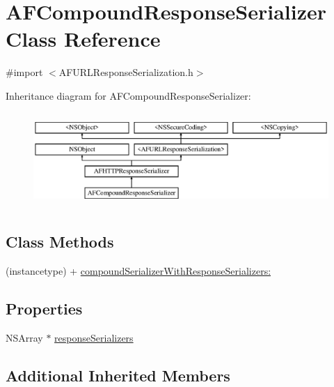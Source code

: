 \hypertarget{interface_a_f_compound_response_serializer}{}\section{A\+F\+Compound\+Response\+Serializer Class Reference}
\label{interface_a_f_compound_response_serializer}


{\ttfamily \#import $<$A\+F\+U\+R\+L\+Response\+Serialization.\+h$>$}

Inheritance diagram for A\+F\+Compound\+Response\+Serializer\+:\begin{figure}[H]
\begin{center}
\leavevmode
\includegraphics[height=3.624595cm]{interface_a_f_compound_response_serializer}
\end{center}
\end{figure}
\subsection*{Class Methods}
\begin{DoxyCompactItemize}
\item 
(instancetype) + \hyperlink{interface_a_f_compound_response_serializer_a48bf2d3d5a18d9cc73b6e29ef30c6e56}{compound\+Serializer\+With\+Response\+Serializers\+:}
\end{DoxyCompactItemize}
\subsection*{Properties}
\begin{DoxyCompactItemize}
\item 
N\+S\+Array $\ast$ \hyperlink{interface_a_f_compound_response_serializer_a909fdc29d0b342748bac1f925390c0bc}{response\+Serializers}
\end{DoxyCompactItemize}
\subsection*{Additional Inherited Members}


